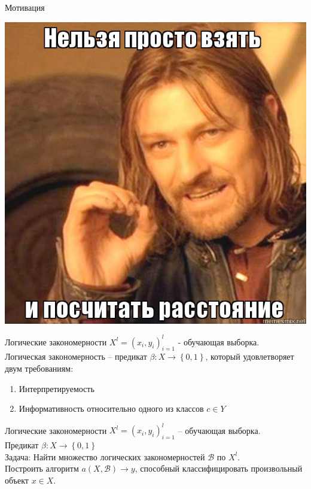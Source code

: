 \documentclass[10pt]{beamer}
\begin{document}
\begin{frame}{Мотивация}
  \begin{center}
	  \includegraphics[width=\textwidth, height=0.8 \textheight, keepaspectratio]{images/distance}
	  \end{center}
\end{frame}

\begin{frame}{Логические закономерности}
	${X^l = \left( x_i, y_i \right)_{i=1}^l}$ - обучающая выборка.\\
	\bigbreak
	\alert{Логическая закономерность} -- предикат ${\beta: X \rightarrow \left\{ 0, 1 \right\} }$, который удовлетворяет двум требованиям:\\
	\pause
	\begin{enumerate} 
		\item Интерпретируемость
		\pause
		\item Информативность относительно одного из классов ${c \in Y}$
	\end{enumerate}
\end{frame}

\begin{frame}{Логические закономерности}
	${X^l = \left( x_i, y_i \right)_{i=1}^l}$ -- обучающая выборка.\\
	\bigbreak
  Предикат ${\beta: X \rightarrow \left\{ 0, 1 \right\} }$\\
	\bigbreak
	\alert{Задача}: Найти множество логических закономерностей $\mathscr{B}$ по $X^l$.\\
	Построить алгоритм $a(X, \mathscr{B}) \rightarrow y$, способный классифицировать произвольный объект ${x \in X}$.
\end{frame}
\end{document}
